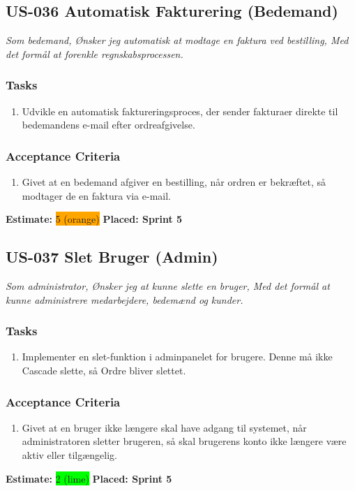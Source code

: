 \subsection{US-036 Automatisk Fakturering (Bedemand)}
\label{sec:US-036}
\textit{Som bedemand, Ønsker jeg automatisk at modtage en faktura ved bestilling, Med det formål at forenkle regnskabsprocessen.}
\subsubsection*{\textbf{Tasks}}
\begin{enumerate}
  \item Udvikle en automatisk faktureringsproces, der sender fakturaer direkte til bedemandens e-mail efter ordreafgivelse.
\end{enumerate}
\subsubsection*{\textbf{Acceptance Criteria}}
\begin{enumerate}
  \item Givet at en bedemand afgiver en bestilling, når ordren er bekræftet, så modtager de en faktura via e-mail.
\end{enumerate}
\textbf{Estimate:} \colorbox{orange}{5 (orange)}
\textbf{Placed: Sprint 5}
\par\noindent\dotfill

\subsection{US-037 Slet Bruger (Admin)}
\label{sec:US-037}
\textit{Som administrator, Ønsker jeg at kunne slette en bruger, Med det formål at kunne administrere medarbejdere, bedemænd og kunder.}
\subsubsection*{\textbf{Tasks}}
\begin{enumerate}
  \item Implementer en slet-funktion i adminpanelet for brugere. Denne må ikke Cascade slette, så Ordre bliver slettet.
\end{enumerate}
\subsubsection*{\textbf{Acceptance Criteria}}
\begin{enumerate}
  \item Givet at en bruger ikke længere skal have adgang til systemet, når administratoren sletter brugeren, så skal brugerens konto ikke længere være aktiv eller tilgængelig.
\end{enumerate}
\textbf{Estimate:} \colorbox{lime}{2 (lime)}
\textbf{Placed: Sprint 5}
\par\noindent\dotfill

